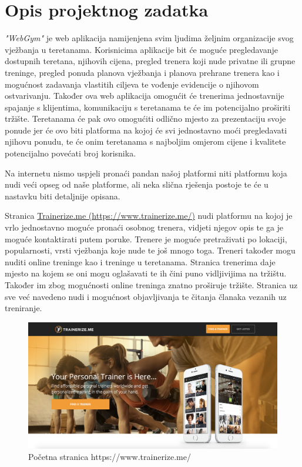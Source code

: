 \chapter{Opis projektnog zadatka}
		
		
		\textit{"WebGym"} je web aplikacija namijenjena svim ljudima željnim organizacije 
		svog vježbanja u teretanama. Korisnicima aplikacije bit će moguće pregledavanje 
		dostupnih teretana, njihovih cijena, pregled trenera koji nude privatne ili grupne 
		treninge, pregled ponuda planova vježbanja i planova prehrane trenera kao i 
		mogućnost zadavanja vlastitih ciljeva te vođenje evidencije o njihovom ostvarivanju.
		Također ova web aplikacija omogućit će trenerima jednostavnije spajanje s klijentima,
		komunikaciju s teretanama te će im potencijalno proširiti tržište. Teretanama će pak 
		ovo omogućiti odlično mjesto za prezentaciju svoje ponude jer će ovo biti platforma 
		na kojoj će svi jednostavno moći pregledavati njihovu ponudu, te će onim teretanama 
		s najboljim omjerom cijene i kvalitete potencijalno povećati broj korisnika. 
		
		\vspace{5mm}
		
		Na internetu nismo uspjeli pronaći pandan našoj platformi niti platformu koja 
		nudi veći opseg od naše platforme, ali neka slična rješenja postoje te će u nastavku 
		biti detaljnije opisana. 
		
		Stranica \href{https://www.trainerize.me/}{Trainerize.me (https://www.trainerize.me/)} nudi platformu na kojoj je vrlo jednostavno moguće pronaći osobnog trenera, vidjeti 
		njegov opis te ga je moguće kontaktirati putem poruke. Trenere je moguće pretraživati po lokaciji, popularnosti, vrsti vježbanja koje nude te još mnogo toga. 
		Treneri također mogu nuditi online treninge kao i treninge u teretanama. Stranica 
		trenerima daje mjesto na kojem se oni mogu oglašavati te ih čini puno vidljivijima na 
		tržištu. Također im zbog mogućnosti online treninga znatno proširuje tržište. Stranica uz sve već navedeno nudi i mogućnost objavljivanja te čitanja članaka 
		vezanih uz treniranje.
		
		\begin{figure}[H]
			\includegraphics[scale=0.20]{slike/trainerizeme1.PNG} %
			\centering
			\caption{Početna stranica https://www.trainerize.me/}
			\label{fig:promjene}
		\end{figure}
	
